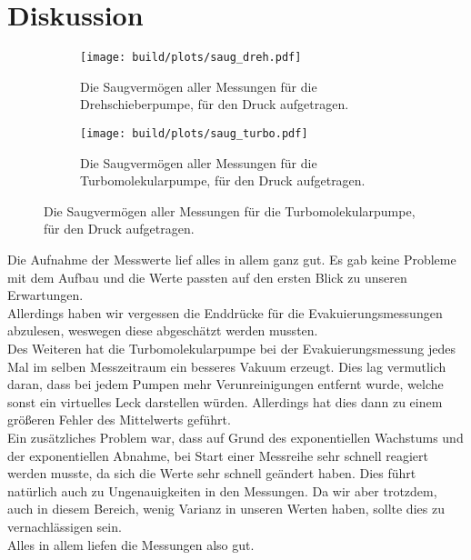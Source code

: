 \newpage
\section{Diskussion}



\begin{figure}[ht]
    \begin{subfigure}{0.46\textwidth}
            \centering
            \texttt{[image: build/plots/saug\_dreh.pdf]}
            \caption{Die Saugvermögen aller Messungen für die Drehschieberpumpe, für den Druck aufgetragen.}
            \label{img:saug_dreh}
    \end{subfigure}
    \hfill
    \begin{subfigure}{0.46\textwidth}
            \centering
            \texttt{[image: build/plots/saug\_turbo.pdf]}
            \caption{Die Saugvermögen aller Messungen für die Turbomolekularpumpe, für den Druck aufgetragen.}
            \label{img:saug_turbo}
    \end{subfigure}
\end{figure}


\noindent Die Aufnahme der Messwerte lief alles in allem ganz gut. Es gab keine Probleme mit dem Aufbau und die Werte passten auf den ersten Blick zu unseren Erwartungen.\\
Allerdings haben wir vergessen die Enddrücke für die Evakuierungsmessungen abzulesen, weswegen diese abgeschätzt werden mussten.\\
Des Weiteren hat die Turbomolekularpumpe bei der Evakuierungsmessung jedes Mal im selben Messzeitraum ein besseres Vakuum erzeugt. 
Dies lag vermutlich daran, dass bei jedem Pumpen mehr Verunreinigungen entfernt wurde, welche sonst ein virtuelles Leck darstellen würden. 
Allerdings hat dies dann zu einem größeren Fehler des Mittelwerts geführt.\\
Ein zusätzliches Problem war, dass auf Grund des exponentiellen Wachstums und der exponentiellen Abnahme, bei Start einer Messreihe sehr schnell reagiert werden musste, da sich die Werte sehr schnell geändert haben.
Dies führt natürlich auch zu Ungenauigkeiten in den Messungen. Da wir aber trotzdem, auch in diesem Bereich, wenig Varianz in unseren Werten haben, sollte dies zu vernachlässigen sein.\\
Alles in allem liefen die Messungen also gut.\\\\

